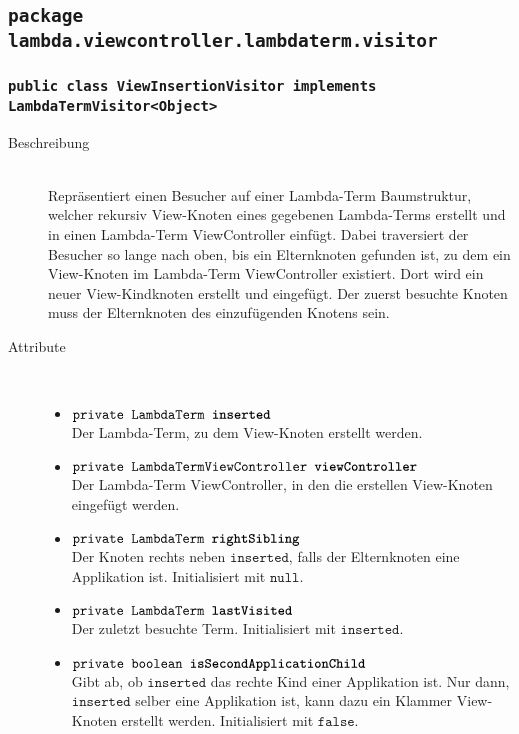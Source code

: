 \subsection{\texttt{package lambda.viewcontroller.lambdaterm.visitor}}

\subsubsection{\normalfont \texttt{public class \textbf{ViewInsertionVisitor} implements LambdaTermVisitor<Object>}}

\begin{description}
\item[Beschreibung] \hfill \\ Repräsentiert einen Besucher auf einer Lambda-Term Baumstruktur, welcher rekursiv View-Knoten eines gegebenen Lambda-Terms erstellt und in einen Lambda-Term ViewController einfügt. Dabei traversiert der Besucher so lange nach oben, bis ein Elternknoten gefunden ist, zu dem ein View-Knoten im Lambda-Term ViewController existiert. Dort wird ein neuer View-Kindknoten erstellt und eingefügt. Der zuerst besuchte Knoten muss der Elternknoten des einzufügenden Knotens sein.

\item[Attribute] \hfill \\
	\vspace{-.8cm}
	\begin{itemize}
		\item $\texttt{private LambdaTerm \textbf{inserted}}$ \\ Der Lambda-Term, zu dem View-Knoten erstellt werden.
		\item $\texttt{private LambdaTermViewController \textbf{viewController}}$ \\ Der Lambda-Term ViewController, in den die erstellen View-Knoten eingefügt werden.
		\item $\texttt{private LambdaTerm \textbf{rightSibling}}$ \\ Der Knoten rechts neben $\texttt{inserted}$, falls der Elternknoten eine Applikation ist. Initialisiert mit $\texttt{null}$.
		\item $\texttt{private LambdaTerm \textbf{lastVisited}}$ \\ Der zuletzt besuchte Term. Initialisiert mit $\texttt{inserted}$.
		\item $\texttt{private boolean \textbf{isSecondApplicationChild}}$ \\ Gibt ab, ob $\texttt{inserted}$ das rechte Kind einer Applikation ist. Nur dann, $\texttt{inserted}$ selber eine Applikation ist, kann dazu ein Klammer View-Knoten erstellt werden.  Initialisiert mit $\texttt{false}$.
	\end{itemize}


\end{description}
